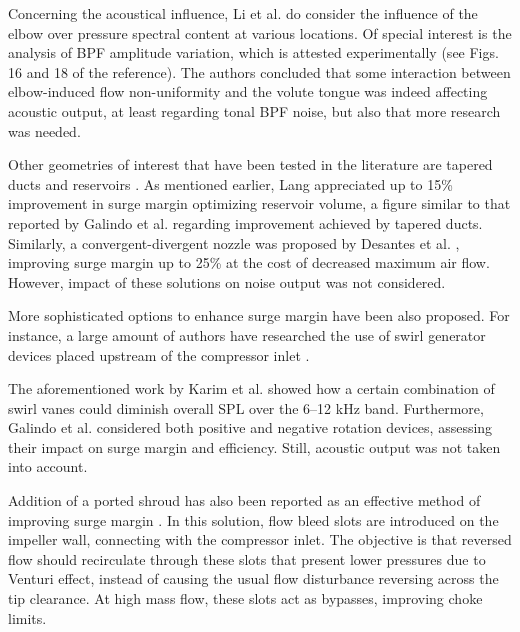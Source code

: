 Concerning the acoustical influence, Li et al. \cite{li2012numerical} do consider the influence of the elbow over pressure spectral content at various locations. Of special interest is the analysis of BPF amplitude variation, which is attested experimentally (see Figs. 16 and 18 of the reference). The authors concluded that some interaction between elbow-induced flow non-uniformity and the volute tongue was indeed affecting acoustic output, at least regarding tonal BPF noise, but also that more research was needed.

Other geometries of interest that have been tested in the literature are tapered ducts \cite{galindo2011measurement,lang2011contribucion} and reservoirs \cite{lang2011contribucion}. As mentioned earlier, Lang appreciated up to 15\% improvement in surge margin optimizing reservoir volume, a figure similar to that reported by Galindo et al. \cite{galindo2011measurement} regarding improvement achieved by tapered ducts. Similarly, a convergent-divergent nozzle was proposed by Desantes et al. \cite{desantes2011potential}, improving surge margin up to 25\% at the cost of decreased maximum air flow. However, impact of these solutions on noise output was not considered.

More sophisticated options to enhance surge margin have been also proposed. For instance, a large amount of authors have researched the use of swirl generator devices placed upstream of the compressor inlet \cite{kyrtatos1980application,coppinger2000performance}. 

The aforementioned work by Karim et al. \cite{karim2013computational} showed how a certain combination of swirl vanes could diminish overall SPL over the 6--12 kHz band. Furthermore, Galindo et al. \cite{galindo2007potential} considered both positive and negative rotation devices, assessing their impact on surge margin and efficiency. Still, acoustic output was not taken into account.

Addition of a ported shroud has also been reported as an effective method of improving surge margin \cite{guillou2010characterization,semlitsch2014numerical}. In this solution, flow bleed slots are introduced on the impeller wall, connecting with the compressor inlet. The objective is that reversed flow should recirculate through these slots that present lower pressures due to Venturi effect, instead of causing the usual flow disturbance reversing across the tip clearance. At high mass flow, these slots act as bypasses, improving choke limits. 

